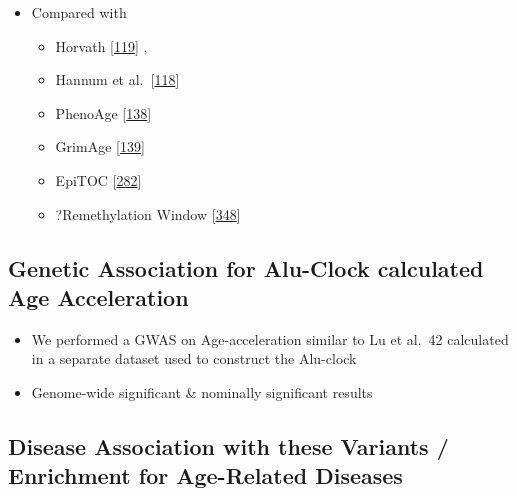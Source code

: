 \documentclass[
]{book}
\providecommand{\tightlist}{%
  \setlength{\itemsep}{0pt}\setlength{\parskip}{0pt}}
\begin{document}
\begin{itemize}
\tightlist
\item
  Compared with

  \begin{itemize}
  \tightlist
  \item
    Horvath {[}\protect\hyperlink{ref-Horvath2013}{119}{]} ,
  \item
    Hannum et al.~{[}\protect\hyperlink{ref-Hannum2013}{118}{]}
  \item
    PhenoAge {[}\protect\hyperlink{ref-Levine2018}{138}{]}
  \item
    GrimAge {[}\protect\hyperlink{ref-Lu2019}{139}{]}
  \item
    EpiTOC {[}\protect\hyperlink{ref-Yang2016}{282}{]}
  \item
    ?Remethylation Window {[}\protect\hyperlink{ref-Zhou2018}{348}{]}
  \end{itemize}
\end{itemize}

\hypertarget{genetic-association-for-alu-clock-calculated-age-acceleration}{%
\subsection{Genetic Association for Alu-Clock calculated Age Acceleration}\label{genetic-association-for-alu-clock-calculated-age-acceleration}}

\begin{itemize}
\tightlist
\item
  We performed a GWAS on Age-acceleration similar to Lu et al.~42 calculated in a separate dataset used to construct the Alu-clock
\item
  Genome-wide significant \& nominally significant results
\end{itemize}

\hypertarget{disease-association-with-these-variants-enrichment-for-age-related-diseases}{%
\subsection{Disease Association with these Variants / Enrichment for Age-Related Diseases}\label{disease-association-with-these-variants-enrichment-for-age-related-diseases}}
\end{document}

